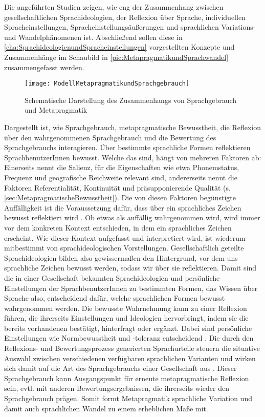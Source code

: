 Die angeführten Studien zeigen, wie eng der Zusammenhang zwischen gesellschaftlichen Sprachideologien, der Reflexion über Sprache, individuellen Spracheinstellungen, Spracheinstellungsäußerungen und sprachlichen Variations- und Wandelphänomenen ist. 
Abschließend sollen diese in \autoref{cha:SprachideologienundSpracheinstellungen} vorgestellten Konzepte und Zusammenhänge im Schaubild in \autoref{pic:MetapragmatikundSprachwandel} zusammengefasst werden.
\begin{figure}
\centering
\texttt{[image: ModellMetapragmatikundSprachgebrauch]}
\caption{Schematische Darstellung des Zusammenhangs von Sprachgebrauch und Metapragmatik}
\label{pic:MetapragmatikundSprachwandel}
\end{figure}
Dargestellt ist, wie Sprachgebrauch, metapragmatische Bewusstheit, die Reflexion über den wahrgenommenen Sprachgebrauch und die Bewertung des Sprachgebrauchs interagieren. 
Über bestimmte sprachliche Formen reflektieren SprachbenutzerInnen bewusst. 
Welche das sind, hängt von mehreren Faktoren ab: Einerseits nennt \citet[]{Auer2014} die Salienz, für die Eigenschaften wie etwa Phonemstatus, Frequenz und geografische Reichweite relevant sind, andererseits nennt \citet[]{Silverstein.1981} die Faktoren Referentialität, Kontinuität und präsupponierende Qualität (s. \autoref{sec:MetapragmatischeBewusstheit}). 
Die von diesen Faktoren begünstigte Auffälligkeit ist die Voraussetzung dafür, dass über ein sprachliches Zeichen bewusst reflektiert wird \citep[s.][374]{Butterworth.2011}. 
Ob etwas als auffällig wahrgenommen wird, wird immer vor dem konkreten Kontext entschieden, in dem ein sprachliches Zeichen erscheint. 
Wie dieser Kontext aufgefasst und interpretiert wird, ist wiederum mitbestimmt von sprachideologischen Vorstellungen.
Gesellschaftlich geteilte Sprachideologien bilden also gewissermaßen den Hintergrund, vor dem uns sprachliche Zeichen bewusst werden, sodass wir über sie reflektieren.
Damit sind die in einer Gesellschaft bekannten Sprachideologien und persönliche Einstellungen der SprachbenutzerInnen zu bestimmten Formen, das Wissen über Sprache also, entscheidend dafür, welche sprachlichen Formen bewusst wahrgenommen werden. 
Die bewusste Wahrnehmung kann zu einer Reflexion führen, die ihrerseits Einstellungen und Ideologien hervorbringt, indem sie die bereits vorhandenen bestätigt, hinterfragt oder ergänzt.
Dabei sind persönliche Einstellungen wie Normbewusstheit und -toleranz entscheidend \citep[s.][375]{Butterworth.2011}. 
Die durch den Reflexions- und Bewertungsprozess generierten Sprachurteile \glqq steuern die situative Auswahl zwischen verschiedenen verfügbaren sprachlichen Varianten und wirken sich damit auf die Art des Sprachgebrauchs einer Gesellschaft aus\grqq{} \citep[372]{Butterworth.2011}.
Dieser Sprachgebrauch kann Ausgangspunkt für erneute metapragmatische Reflexion sein, evtl. mit anderen Bewertungsergebnissen, die ihrerseits wieder den Sprachgebrauch prägen. 
Somit formt Metapragmatik sprachliche Variation und damit auch sprachlichen Wandel zu einem erheblichen Maße mit. 
